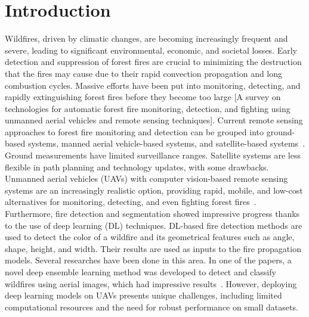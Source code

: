 \documentclass[sigconf, noacm]{acmart}
\begin{document}




\maketitle
\pagestyle{plain} %

\section{Introduction}
Wildfires, driven by climatic changes, are becoming increasingly frequent and severe, leading to significant environmental, economic, and societal losses. Early detection and suppression of forest fires are crucial to minimizing the destruction that the fires may cause due to their rapid convection propagation and long combustion cycles. Massive efforts have been put into monitoring, detecting, and rapidly extinguishing forest fires before they become too large [A survey on technologies for automatic forest fire monitoring, detection, and fighting using unmanned aerial vehicles and remote sensing techniques]. Current remote sensing approaches to forest fire monitoring and detection can be grouped into ground-based systems, manned aerial vehicle-based systems, and satellite-based systems~\cite{DenBreejen1998}. Ground measurements have limited surveillance ranges. Satellite systems are less flexible in path planning and technology updates, with some drawbacks. Unmanned aerial vehicles (UAVs) with computer vision-based remote sensing systems are an increasingly realistic option, providing rapid, mobile, and low-cost alternatives for monitoring, detecting, and even fighting forest fires~\cite{Yuan2015}.  Furthermore, fire detection and segmentation showed impressive progress thanks to the use of deep learning (DL) techniques. DL-based fire detection methods are used to detect the color of a wildfire and its geometrical features such as angle, shape, height, and width. Their results are used as inputs to the fire propagation models. Several researches have been done in this area. 
In one of the papers, a novel deep ensemble learning method was developed to detect and classify wildfires using aerial images, which had impressive results~\cite{Ghali2022}. However, deploying deep learning models on UAVs presents unique challenges, including limited computational resources and the need for robust performance on small datasets.
\end{document}

